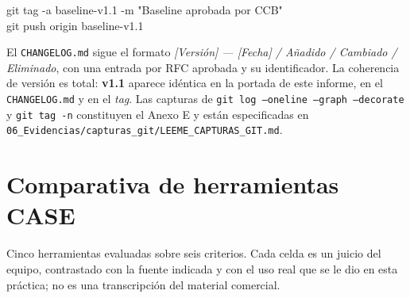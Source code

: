 \documentclass[11pt,letterpaper]{article}
\newcommand{\versionbase}{v1.1}
\begin{document}
\begin{center}
\ttfamily\small
git tag -a baseline-v1.1 -m "Baseline aprobada por CCB"\\
git push origin baseline-v1.1
\end{center}

El \texttt{CHANGELOG.md} sigue el formato \emph{[Versión] --- [Fecha] / Añadido / Cambiado / Eliminado}, con una entrada por RFC aprobada y su identificador. La coherencia de versión es total: \textbf{\versionbase} aparece idéntica en la portada de este informe, en el \texttt{CHANGELOG.md} y en el \emph{tag}. Las capturas de \texttt{git log --oneline --graph --decorate} y \texttt{git tag -n} constituyen el Anexo E y están especificadas en \texttt{06\_Evidencias/capturas\_git/LEEME\_CAPTURAS\_GIT.md}.

\section{Comparativa de herramientas CASE}

Cinco herramientas evaluadas sobre seis criterios. Cada celda es un juicio del equipo, contrastado con la fuente indicada y con el uso real que se le dio en esta práctica; no es una transcripción del material comercial.
\end{document}
